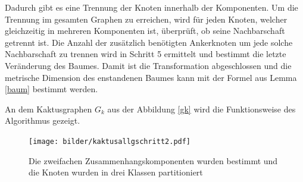 Dadurch gibt es eine Trennung der Knoten innerhalb der Komponenten. Um die Trennung im gesamten Graphen zu erreichen, wird für jeden Knoten, welcher gleichzeitig in mehreren Komponenten ist, überprüft, ob seine Nachbarschaft getrennt ist. Die Anzahl der zusätzlich benötigten Ankerknoten um jede solche Nachbarschaft zu trennen wird in Schritt 5 ermittelt und bestimmt die letzte Veränderung des Baumes. Damit ist die Transformation abgeschlossen und die metrische Dimension des enstandenen Baumes kann mit der Formel aus Lemma \ref{baum} bestimmt werden.
\begin{bsp} An dem Kaktusgraphen $G_k$ aus der Abbildung \ref{gk} wird die Funktionsweise des Algorithmus gezeigt.\newline
\vspace{-3mm}
 	   	 \begin{figure}[h!]
		\centering
 		 \texttt{[image: bilder/kaktusallgschritt2.pdf]}
   \caption{Die zweifachen Zusammenhangskomponenten wurden bestimmt und die Knoten wurden in drei Klassen partitioniert}
      \label{kaktus1}
  	 \end{figure}
  	 

\end{bsp}
